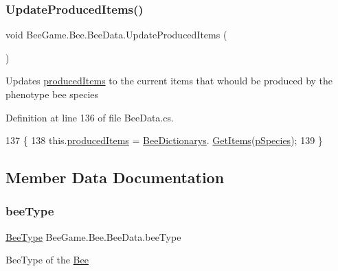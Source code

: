 \subsubsection{\texorpdfstring{Update\+Produced\+Items()}{UpdateProducedItems()}}
{\footnotesize\ttfamily void Bee\+Game.\+Bee.\+Bee\+Data.\+Update\+Produced\+Items (\begin{DoxyParamCaption}{ }\end{DoxyParamCaption})}



Updates \hyperlink{struct_bee_game_1_1_bee_1_1_bee_data_a3c49396295407e1744f501e86c32d61c}{produced\+Items} to the current items that whould be produced by the phenotype bee species 



Definition at line 136 of file Bee\+Data.\+cs.


\begin{DoxyCode}
137         \{
138             this.\hyperlink{struct_bee_game_1_1_bee_1_1_bee_data_a3c49396295407e1744f501e86c32d61c}{producedItems} = \hyperlink{class_bee_game_1_1_core_1_1_bee_dictionarys}{BeeDictionarys}.
      \hyperlink{class_bee_game_1_1_core_1_1_bee_dictionarys_a2cd137701cfdcfeb25d5e7a73397e1b4}{GetItems}(\hyperlink{struct_bee_game_1_1_bee_1_1_bee_data_a87db9add2bcc463ab444eb4ac7a4e228}{pSpecies});
139         \}
\end{DoxyCode}


\subsection{Member Data Documentation}
\mbox{\label{struct_bee_game_1_1_bee_1_1_bee_data_acfb6e209ae7bd1b52928580fcce4c743}} 
\subsubsection{\texorpdfstring{bee\+Type}{beeType}}
{\footnotesize\ttfamily \hyperlink{namespace_bee_game_1_1_enums_a9376a1582db99d20c756e24de728944f}{Bee\+Type} Bee\+Game.\+Bee.\+Bee\+Data.\+bee\+Type}



Bee\+Type of the \hyperlink{namespace_bee_game_1_1_bee}{Bee} 



